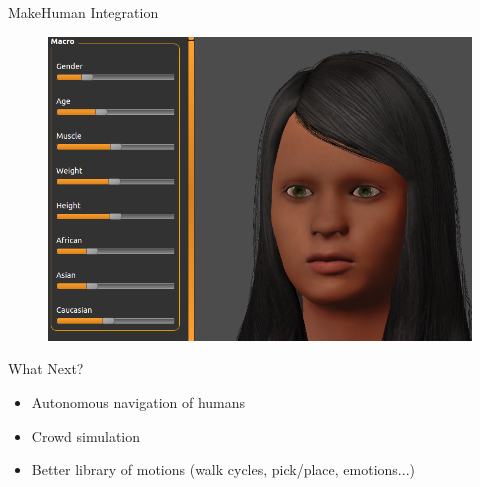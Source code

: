 \documentclass[compress]{beamer}
\begin{document}
\begin{frame}{MakeHuman Integration}
    \begin{figure}
        \centering
        \includegraphics[width=\linewidth]{makehuman}
    \end{figure}
\end{frame}


\begin{frame}{What Next?}
    \begin{itemize}
        \item<1-> Autonomous navigation of humans
        \item<2-> Crowd simulation
        \item<3-> Better library of motions (walk cycles, pick/place, emotions...)
    \end{itemize}

\end{frame}


\maketitle
\end{document}

